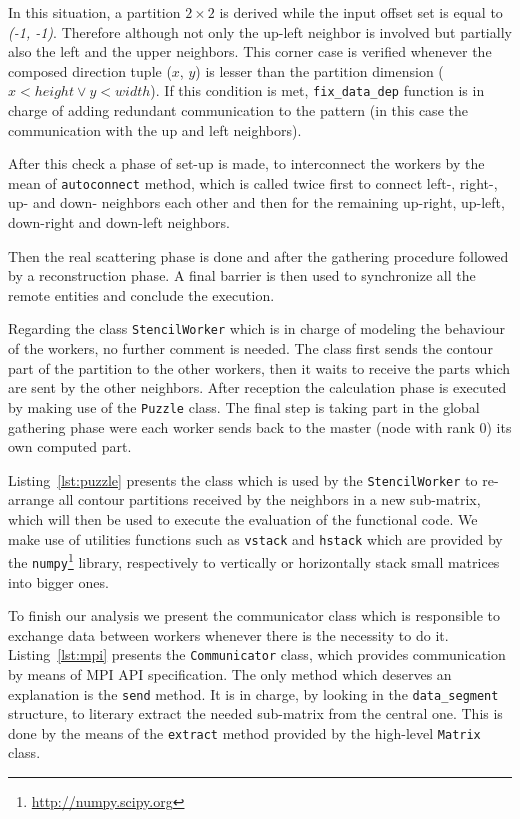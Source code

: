 In this situation, a partition $2\times2$ is derived while the input
offset set is equal to \emph{(-1, -1)}. Therefore although not only the
up-left neighbor is involved but partially also the left and the upper
neighbors. This corner case is verified whenever the composed direction
tuple ($x$, $y$) is lesser than the partition dimension ($x < height
\lor y < width$). If this condition is met, \texttt{fix\_data\_dep}
function is in charge of adding redundant communication to the pattern
(in this case the communication with the up and left neighbors).

After this check a phase of set-up is made, to interconnect the workers
by the mean of \texttt{autoconnect} method, which is called twice first
to connect left-, right-, up- and down- neighbors each other and then
for the remaining up-right, up-left, down-right and down-left neighbors.

Then the real scattering phase is done and after the gathering procedure
followed by a reconstruction phase. A final barrier is then used to
synchronize all the remote entities and conclude the execution.

Regarding the class \texttt{StencilWorker} which is in charge of
modeling the behaviour of the workers, no further comment is needed. The
class first sends the contour part of the partition to the other
workers, then it waits to receive the parts which are sent by the
other neighbors. After reception the calculation phase is executed by
making use of the \texttt{Puzzle} class. The final step is taking part
in the global gathering phase were each worker sends back to the master
(node with rank 0) its own computed part.



Listing~\ref{lst:puzzle} presents the class which is used by the
\texttt{StencilWorker} to re-arrange all contour partitions received by
the neighbors in a new sub-matrix, which will then be used to execute
the evaluation of the functional code. We make use of utilities
functions such as \texttt{vstack} and \texttt{hstack} which are provided
by the \texttt{numpy}\footnote{\url{http://numpy.scipy.org}} library,
respectively to vertically or horizontally stack small matrices into
bigger ones.



To finish our analysis we present the communicator class which is
responsible to exchange data between workers whenever there is the
necessity to do it. Listing~\ref{lst:mpi} presents the
\texttt{Communicator} class, which provides communication by means of
MPI API specification. The only method which deserves an explanation is
the \texttt{send} method. It is in charge, by looking in the
\texttt{data\_segment} structure, to literary extract the needed
sub-matrix from the central one. This is done by the means of the
\texttt{extract} method provided by the high-level \texttt{Matrix}
class.

